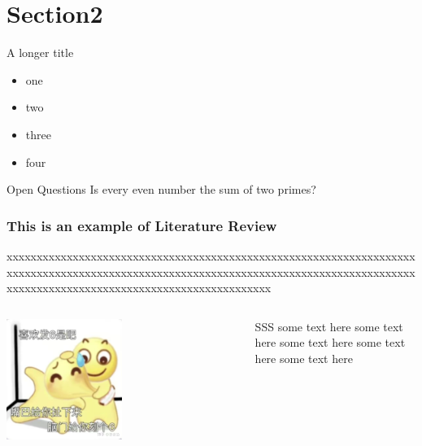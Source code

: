 \documentclass{beamer}
\begin{document}
\section{Section2}
\begin{frame}[t]{A longer title}
  \begin{itemize}
    \item one
    \item two
    \item three
    \item four
  \end{itemize}



  \begin{block}{Open Questions}
    Is every even number the sum of two primes?

  \end{block}
\end{frame}




\begin{frame}
  \frametitle{This is an example of Literature Review}
  xxxxxxxxxxxxxxxxxxxxxxxxxxxxxxxxxxxxxxxxxxxxxxxxxxxxxxxxxxxxxxxxxxxxxxxxxxxxxxxxxxxxxxxxxxxxxxxxxxxxxxxxxxxxxxxxxxxxxxxxxxxxxxxxxxxxxxxxxxxxxxxxxxxxxxxxxxxxxxxxxxxxxxxxxxxxxxxxxxxx


  \begin{columns}
    \begin{column}{0.5\textwidth}
      \begin{center}
        \includegraphics[width=0.5\textwidth]{pic/1.png}
      \end{center}
    \end{column}

    \begin{column}{0.5\textwidth}
      \begin{block}{SSS}
        some text here some text here some text here some text here some text here

      \end{block}

    \end{column}

  \end{columns}


\end{frame}
\end{document}
